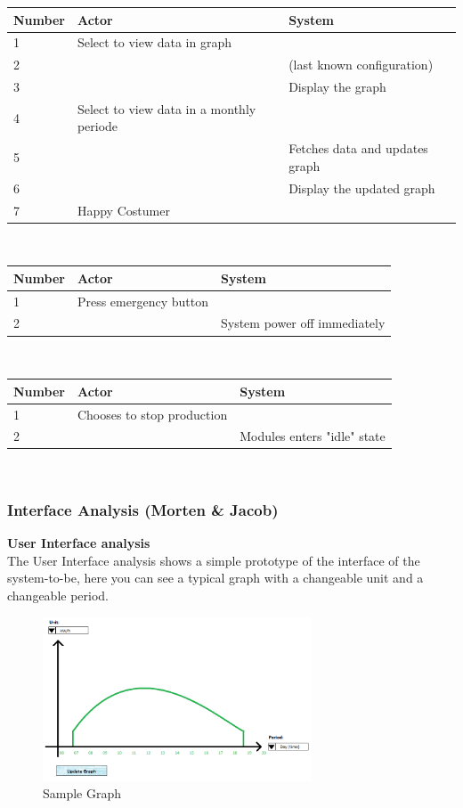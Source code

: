 \documentclass[12pt,a4paper]{report}
\begin{document}
\begin{tabular}{|l|l|l|}
\hline Number & Actor & System \\ 
\hline 1 & Select to view data in graph &  \\ 
\hline 2 &  &  (last known configuration) \\ 
\hline 3 &  & Display the graph \\ 
\hline 4 & Select to view data in a monthly periode &  \\ 
\hline 5 &  & Fetches data and updates graph \\ 
\hline 6 &  & Display the updated graph \\ 
\hline 7 & Happy Costumer &  \\ 
\hline 
\end{tabular} \\
\begin{tabular}{|l|l|l|}
\hline Number & Actor & System \\ 
\hline 1 & Press emergency button &  \\ 
\hline 2 &  &  System power off immediately \\ 
\hline
\end{tabular} \\
\begin{tabular}{|l|l|l|}
\hline Number & Actor & System \\ 
\hline 1 & Chooses to stop production &  \\ 
\hline 2 &  &  Modules enters "idle" state \\ 
\hline
\end{tabular} \\
\subsubsection{Interface Analysis (Morten \& Jacob)}
\textbf{User Interface analysis}\\

The User Interface analysis shows a simple prototype of the interface of the system-to-be, here you can see a typical graph with a changeable unit and a changeable period.

\begin{figure}[htbp]
\centering
\includegraphics[width=8cm]{images/SampleGraph}
\caption{Sample Graph}
\label{fig:SampleGraph}
\end{figure}
\end{document}
